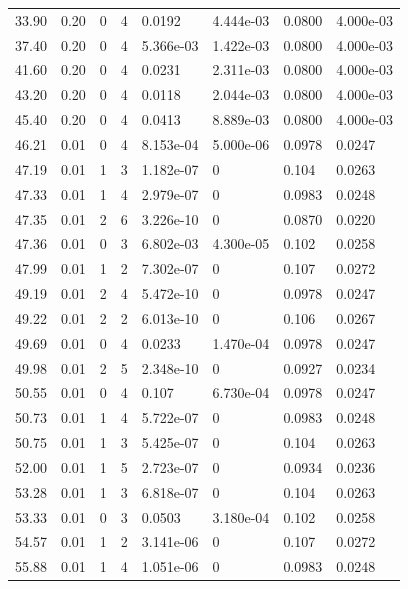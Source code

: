 \documentclass[preview]{standalone}
\begin{document}
{{\begin{tabular}{L{1.2cm}C{1.2cm} C{0.3cm}C{0.5cm} C{1.4cm}C{1.4cm} C{1.4cm}C{1.4cm}}
  33.90  &  0.20  & 0     &  4 &  0.0192  & 4.444e-03  & 0.0800 &  4.000e-03   \\ 
  37.40  &  0.20  & 0     &  4 &  5.366e-03  & 1.422e-03  & 0.0800 &  4.000e-03   \\ 
  41.60  &  0.20  & 0     &  4 &  0.0231  & 2.311e-03  & 0.0800 &  4.000e-03   \\ 
  43.20  &  0.20  & 0     &  4 &  0.0118  & 2.044e-03  & 0.0800 &  4.000e-03   \\ 
  45.40  &  0.20  & 0     &  4 &  0.0413  & 8.889e-03  & 0.0800 &  4.000e-03   \\ 
  46.21  &  0.01  & 0     &  4 &  8.153e-04  & 5.000e-06  & 0.0978 &  0.0247   \\ 
  47.19  &  0.01  & 1     &  3 &  1.182e-07  & 0  & 0.104 &  0.0263   \\ 
  47.33  &  0.01  & 1     &  4 &  2.979e-07  & 0  & 0.0983 &  0.0248   \\ 
  47.35  &  0.01  & 2     &  6 &  3.226e-10  & 0  & 0.0870 &  0.0220   \\ 
  47.36  &  0.01  & 0     &  3 &  6.802e-03  & 4.300e-05  & 0.102 &  0.0258   \\ 
  47.99  &  0.01  & 1     &  2 &  7.302e-07  & 0  & 0.107 &  0.0272   \\ 
  49.19  &  0.01  & 2     &  4 &  5.472e-10  & 0  & 0.0978 &  0.0247   \\ 
  49.22  &  0.01  & 2     &  2 &  6.013e-10  & 0  & 0.106 &  0.0267   \\ 
  49.69  &  0.01  & 0     &  4 &  0.0233  & 1.470e-04  & 0.0978 &  0.0247   \\ 
  49.98  &  0.01  & 2     &  5 &  2.348e-10  & 0  & 0.0927 &  0.0234   \\ 
  50.55  &  0.01  & 0     &  4 &  0.107  & 6.730e-04  & 0.0978 &  0.0247   \\ 
  50.73  &  0.01  & 1     &  4 &  5.722e-07  & 0  & 0.0983 &  0.0248   \\ 
  50.75  &  0.01  & 1     &  3 &  5.425e-07  & 0  & 0.104 &  0.0263   \\ 
  52.00  &  0.01  & 1     &  5 &  2.723e-07  & 0  & 0.0934 &  0.0236   \\ 
  53.28  &  0.01  & 1     &  3 &  6.818e-07  & 0  & 0.104 &  0.0263   \\ 
  53.33  &  0.01  & 0     &  3 &  0.0503  & 3.180e-04  & 0.102 &  0.0258   \\ 
  54.57  &  0.01  & 1     &  2 &  3.141e-06  & 0  & 0.107 &  0.0272   \\ 
  55.88  &  0.01  & 1     &  4 &  1.051e-06  & 0  & 0.0983 &  0.0248   \\ 

\end{tabular}}}
\end{document}

